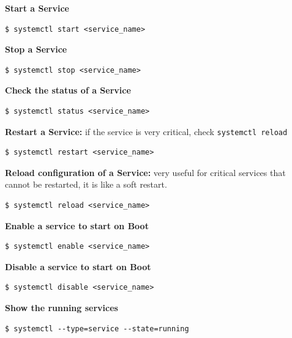 \documentclass{article}
\newenvironment{codetemplate}[1][]{%
  \mybasecolorbox[#1]
  \itshape
}{%
  \endmybasecolorbox
}
\begin{document}
\textbf{Start a Service}
\begin{codetemplate}{}
\begin{verbatim}
$ systemctl start <service_name>
\end{verbatim}
\end{codetemplate}

\textbf{Stop a Service}
\begin{codetemplate}{}
\begin{verbatim}
$ systemctl stop <service_name>
\end{verbatim}
\end{codetemplate}

\textbf{Check the status of a Service}
\begin{codetemplate}{}
\begin{verbatim}
$ systemctl status <service_name>
\end{verbatim}
\end{codetemplate}

\textbf{Restart a Service:} if the service is very critical, check \verb|systemctl reload|
\begin{codetemplate}{}
\begin{verbatim}
$ systemctl restart <service_name>
\end{verbatim}
\end{codetemplate}

\textbf{Reload configuration of a Service:} very useful for critical services that cannot be restarted, it is like a soft restart.
\begin{codetemplate}{}
\begin{verbatim}
$ systemctl reload <service_name>
\end{verbatim}
\end{codetemplate}

\textbf{Enable a service to start on Boot}
\begin{codetemplate}{}
\begin{verbatim}
$ systemctl enable <service_name>
\end{verbatim}
\end{codetemplate}

\textbf{Disable a service to start on Boot}
\begin{codetemplate}{}
\begin{verbatim}
$ systemctl disable <service_name>
\end{verbatim}
\end{codetemplate}

\textbf{Show the running services}
\begin{codetemplate}{}
\begin{verbatim}
$ systemctl --type=service --state=running
\end{verbatim}
\end{codetemplate}
\end{document}

